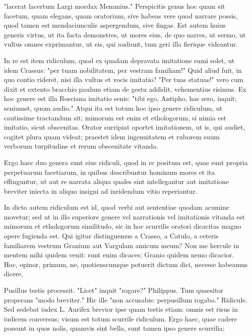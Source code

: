  "lacerat lacertum Largi mordax Memmius." Perspicitis genus hoc quam sit facetum, quam elegans, quam oratorium, sive habeas vere quod narrare possis, quod tamen est mendaciunculis aspergendum, sive fingas. Est autem huius generis virtus, ut ita facta demonstres, ut mores eius, de quo narres, ut sermo, ut vultus omnes exprimantur, ut eis, qui audiunt, tum geri illa fierique videantur.

 In re est item ridiculum, quod ex quadam depravata imitatione sumi solet, ut idem Crassus: "per tuam nobilitatem, per vestram familiam!" Quid aliud fuit, in quo contio rideret, nisi illa vultus et vocis imitatio? "Per tuas statuas!" vero cum dixit et extento bracchio paulum etiam de gestu addidit, vehementius risimus. Ex hoc genere est illa Rosciana imitatio senis: "tibi ego, Antipho, has sero, inquit; seniumst, quom audio." Atqui ita est totum hoc ipso genere ridiculum, ut cautissime tractandum sit; mimorum est enim et ethologorum, si nimia est imitatio, sicut obscenitas. Orator surripiat oportet imitationem, ut is, qui audiet, cogitet plura quam videat; praestet idem ingenuitatem et ruborem suum verborum turpitudine et rerum obscenitate vitanda.

 Ergo haec duo genera sunt eius ridiculi, quod in re positum est, quae sunt propria perpetuarum facetiarum, in quibus describuntur hominum mores et ita effinguntur, ut aut re narrata aliqua quales sint intellegantur aut imitatione breviter iniecta in aliquo insigni ad inridendum vitio reperiantur.

 In dicto autem ridiculum est id, quod verbi aut sententiae quodam acumine movetur; sed ut in illo superiore genere vel narrationis vel imitationis vitanda est mimorum et ethologorum similitudo, sic in hoc scurrilis oratori dicacitas magno opere fugienda est. Qui igitur distinguemus a Crasso, a Catulo, a ceteris familiarem vestrum Granium aut Vargulam amicum meum? Non me hercule in mentem mihi quidem venit: sunt enim dicaces; Granio quidem nemo dicacior. Hoc, opinor, primum, ne, quotienscumque potuerit dictum dici, necesse habeamus dicere.

 Pusillus testis processit. "Licet" inquit "rogare?" Philippus. Tum quaesitor properans "modo breviter." Hic ille "non accusabis: perpusillum rogabo." Ridicule. Sed sedebat iudex L. Aurifex brevior ipse quam testis etiam: omnis est risus in iudicem conversus; visum est totum scurrile ridiculum. Ergo haec, quae cadere possunt in quos nolis, quamvis sint bella, sunt tamen ipso genere scurrilia;

